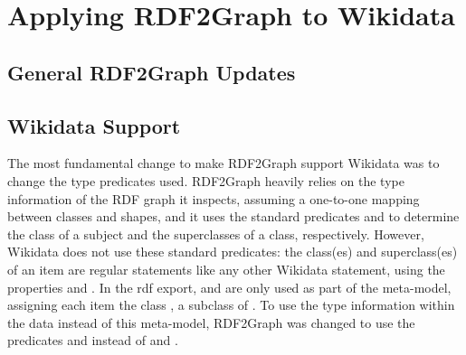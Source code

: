 
\chapter{Applying RDF2Graph to Wikidata}
\label{ch:RDF2Graph+Wikidata}

\section{General RDF2Graph Updates}
\label{sec:RDF2Graph+Wikidata:updates}

\section{Wikidata Support}
\label{sec:RDF2Graph+Wikidata:Wikidata}

The most fundamental change to make RDF2Graph support Wikidata
was %
to change the type predicates used.
RDF2Graph heavily relies on the type information of the RDF graph it inspects,
assuming a one-to-one mapping between classes and shapes,
and it uses the standard predicates  and 
to determine the class of a subject and the superclasses of a class, respectively.
However, Wikidata does not use these standard predicates:
the class(es) and superclass(es) of an item
are regular statements like any other Wikidata statement,
using the properties  and .
In the \gls{rdf} export,  and  are only used
as part of the meta-model, %
assigning each item the class , a subclass of .
To use the type information within the data instead of this meta-model,
RDF2Graph was changed to use the predicates  and  %
instead of  and .

